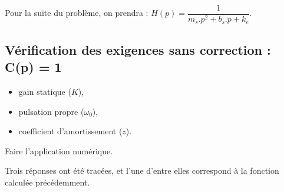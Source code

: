 Pour la suite du problème, on prendra : $H(p)=\dfrac{1}{m_s.p^2+b_s.p+k_e}$.

\newpage

\subsection{Vérification des exigences sans correction : C(p) = 1}

\begin{itemize}
 \item gain statique ($K$),
 \item pulsation propre ($\omega_0$),
 \item coefficient d'amortissement ($z$). 
\end{itemize}

Faire l'application numérique.

Trois réponses ont été tracées, et l'une d'entre elles correspond à la fonction calculée précédemment.


